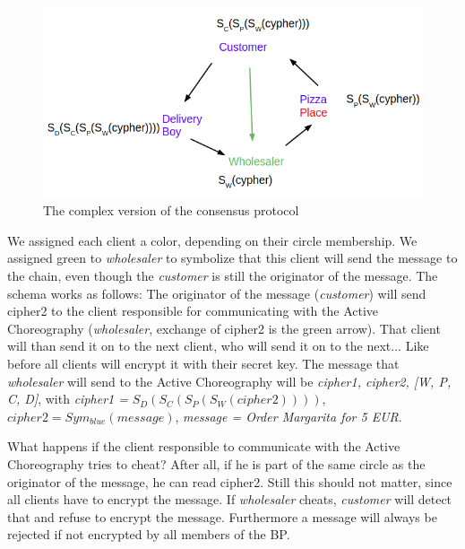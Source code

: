 \documentclass[runningheads]{llncs}
\begin{document}
\begin{figure}
    \centering
    \includegraphics[scale=0.6]{complex.png}
    \caption{The complex version of the consensus protocol}
    \label{fig:complex}
\end{figure}


We assigned each client a color, depending on their circle membership. We assigned green to \textit{wholesaler} to symbolize that this client will send the message to the chain, even though the \textit{customer} is still the originator of the message. The schema works as follows: The originator of the message (\textit{customer}) will send cipher2 to the client responsible for communicating with the Active Choreography (\textit{wholesaler}, exchange of cipher2 is the green arrow). That client will than send it on to the next client, who will send it on to the next... Like before all clients will encrypt it with their secret key. The message that \textit{wholesaler} will send to the Active Choreography will be \textit{cipher1, cipher2, [W, P, C, D]}, with \textit{cipher1 =} $S_D(S_C(S_P(S_W(cipher2))))$, $cipher2 = Sym_{blue}(message)$, \textit{message = Order Margarita for 5 EUR}. 

What happens if the client responsible to communicate with the Active Choreography tries to cheat? After all, if he is part of the same circle as the originator of the message, he can read cipher2. Still this should not matter, since all clients have to encrypt the message. If \textit{wholesaler} cheats, \textit{customer} will detect that and refuse to encrypt the message. Furthermore a message will always be rejected if not encrypted by all members of the BP.
\end{document}
